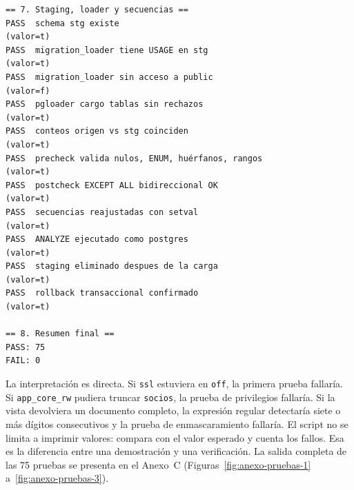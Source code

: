 \begin{lstlisting}[style=terminal,caption={Evidencias reales de hardening (extracto)},label={lst:evidencia-hardening}]
== 7. Staging, loader y secuencias ==
PASS  schema stg existe                                            (valor=t)
PASS  migration_loader tiene USAGE en stg                          (valor=t)
PASS  migration_loader sin acceso a public                         (valor=f)
PASS  pgloader cargo tablas sin rechazos                           (valor=t)
PASS  conteos origen vs stg coinciden                              (valor=t)
PASS  precheck valida nulos, ENUM, huérfanos, rangos               (valor=t)
PASS  postcheck EXCEPT ALL bidireccional OK                        (valor=t)
PASS  secuencias reajustadas con setval                            (valor=t)
PASS  ANALYZE ejecutado como postgres                              (valor=t)
PASS  staging eliminado despues de la carga                        (valor=t)
PASS  rollback transaccional confirmado                            (valor=t)

== 8. Resumen final ==
PASS: 75
FAIL: 0
\end{lstlisting}

La interpretación es directa. Si \texttt{ssl} estuviera en \texttt{off}, la
primera prueba fallaría. Si \texttt{app\_core\_rw} pudiera truncar
\texttt{socios}, la prueba de privilegios fallaría. Si la vista devolviera un
documento completo, la expresión regular detectaría siete o más dígitos
consecutivos y la prueba de enmascaramiento fallaría. El script no se limita
a imprimir valores: compara con el valor esperado y cuenta los fallos. Esa
es la diferencia entre una demostración y una verificación. La salida completa
de las 75 pruebas se presenta en el Anexo~C
(Figuras~\ref{fig:anexo-pruebas-1} a~\ref{fig:anexo-pruebas-3}).
